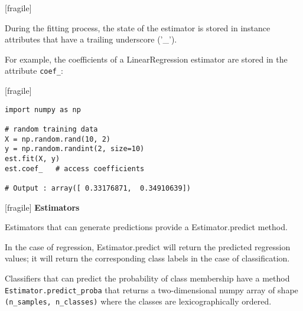 \documentclass[MASTER.tex]{subfiles}
\begin{document}
 
 [fragile]
 
 
\item During the fitting process, the state of the estimator is stored in instance attributes that have a trailing underscore ('\_'). 
\item For example, the coefficients of a LinearRegression estimator are stored in the attribute \texttt{coef\_}:
 

 
 [fragile]
\begin{framed}
\begin{verbatim}
import numpy as np

# random training data
X = np.random.rand(10, 2)
y = np.random.randint(2, size=10)
est.fit(X, y)
est.coef_   # access coefficients

# Output : array([ 0.33176871,  0.34910639])
\end{verbatim}
\end{framed}
 
 [fragile]
 \textbf{Estimators}
 
 
\item Estimators that can generate predictions provide a Estimator.predict method.
\item In the case of regression, Estimator.predict will return the predicted regression values; it will return the corresponding class labels in the case of classification.
\item  Classifiers that can predict the probability of class membership have a method \texttt{Estimator.predict\_proba} that returns a two-dimensional numpy array of shape \texttt{(n\_samples, n\_classes)} where the classes are lexicographically ordered.
 

 

% 
% 
%
% 
\end{document}
